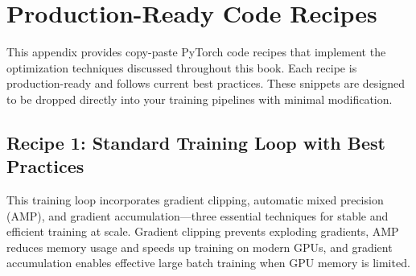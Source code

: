 \documentclass[../main.tex]{subfiles}
\begin{document}
\chapter{Production-Ready Code Recipes}\label{app:recipes}

This appendix provides copy-paste PyTorch code recipes that implement the optimization techniques discussed throughout this book. Each recipe is production-ready and follows current best practices. These snippets are designed to be dropped directly into your training pipelines with minimal modification.

\section{Recipe 1: Standard Training Loop with Best Practices}\label{sec:recipe-training-loop}

This training loop incorporates gradient clipping, automatic mixed precision (AMP), and gradient accumulation---three essential techniques for stable and efficient training at scale. Gradient clipping prevents exploding gradients, AMP reduces memory usage and speeds up training on modern GPUs, and gradient accumulation enables effective large batch training when GPU memory is limited.
\end{document}
